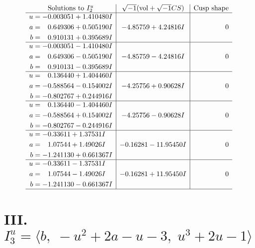 \documentclass[1p]{elsarticle_modified}
\theoremstyle{definition}
\newcommand{\I}{\sqrt{-1}}
\begin{document}
$$\begin{array}{c|c|c}
\text{Solutions to }I^u_{2}& \I (\text{vol} + \sqrt{-1}CS) & \text{Cusp shape}\\
 \hline 
\begin{aligned}
u &= -0.003051 + 1.410480 I \\
a &= \phantom{-}0.649306 + 0.505190 I \\
b &= \phantom{-}0.910131 + 0.395689 I\end{aligned}
 & -4.85759 + 4.24816 I & \phantom{-0.000000 } 0 \\ \hline\begin{aligned}
u &= -0.003051 - 1.410480 I \\
a &= \phantom{-}0.649306 - 0.505190 I \\
b &= \phantom{-}0.910131 - 0.395689 I\end{aligned}
 & -4.85759 - 4.24816 I & \phantom{-0.000000 } 0 \\ \hline\begin{aligned}
u &= \phantom{-}0.136440 + 1.404460 I \\
a &= -0.588564 - 0.154002 I \\
b &= -0.802767 + 0.244916 I\end{aligned}
 & -4.25756 + 0.90628 I & \phantom{-0.000000 } 0 \\ \hline\begin{aligned}
u &= \phantom{-}0.136440 - 1.404460 I \\
a &= -0.588564 + 0.154002 I \\
b &= -0.802767 - 0.244916 I\end{aligned}
 & -4.25756 - 0.90628 I & \phantom{-0.000000 } 0 \\ \hline\begin{aligned}
u &= -0.33611 + 1.37531 I \\
a &= \phantom{-}1.07544 + 1.49026 I \\
b &= -1.241130 + 0.661367 I\end{aligned}
 & -0.16281 - 11.95450 I & \phantom{-0.000000 } 0 \\ \hline\begin{aligned}
u &= -0.33611 - 1.37531 I \\
a &= \phantom{-}1.07544 - 1.49026 I \\
b &= -1.241130 - 0.661367 I\end{aligned}
 & -0.16281 + 11.95450 I & \phantom{-0.000000 } 0\\
 \hline 
 \end{array}$$\newpage\newpage\renewcommand{\arraystretch}{1}
\centering \section*{III. $I^u_{3}= \langle b,\;- u^2+2 a- u-3,\;u^3+2 u-1 \rangle$}
\end{document}

